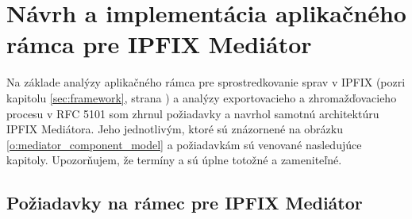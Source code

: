 \section{Návrh a implementácia aplikačného rámca pre IPFIX Mediátor}

Na základe analýzy aplikačného rámca pre sprostredkovanie sprav v IPFIX (pozri kapitolu \ref{sec:framework}, 
strana \pageref{sec:framework}) a analýzy exportovacieho a zhromažďovacieho procesu v RFC 5101
\citep{rfc5101} som zhrnul požiadavky a navrhol samotnú architektúru IPFIX Mediátora. 
Jeho jednotlivým, ktoré sú znázornené na obrázku \ref{o:mediator_component_model} a požiadavkám
sú venované nasledujúce kapitoly. Upozorňujem, že termíny  a 
 sú úplne totožné a zameniteľné.


\subsection{Požiadavky na rámec pre IPFIX Mediátor}

